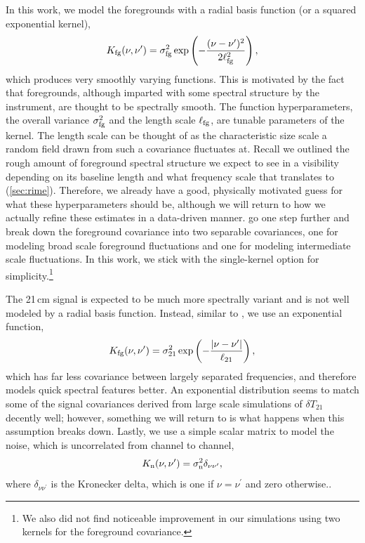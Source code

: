 \documentclass[a4paper,fleqn,usenatbib]{mnras}
\def\Kfg{K_{\rm fg}}
\def\Kn{K_{\rm n}}
\def\sigmafg{\sigma_{\rm fg}}
\def\ellfg{\ell_{\rm fg}}
\def\sigman{\sigma_{\rm n}}
\def\sigmato{\sigma_{\rm 21}}
\def\ellto{\ell_{\rm 21}}
\begin{document}
In this work, we model the foregrounds with a radial basis function (or a squared exponential kernel),
\begin{align}
\label{label:fg_kernel}
\Kfg(\nu, \nu^\prime) = \sigmafg^2\exp\left(-\frac{(\nu-\nu^\prime)^2}{2\ellfg^2}\right),
\end{align}
which produces very smoothly varying functions.
This is motivated by the fact that foregrounds, although imparted with some spectral structure by the instrument, are thought to be spectrally smooth.
The function hyperparameters, the overall variance $\sigmafg^2$ and the length scale $\ellfg$, are tunable parameters of the kernel.
The length scale can be thought of as the characteristic size scale a random field drawn from such a covariance fluctuates at.
Recall we outlined the rough amount of foreground spectral structure we expect to see in a visibility depending on its baseline length and what frequency scale that translates to (\autoref{sec:rime}).
Therefore, we already have a good, physically motivated guess for what these hyperparameters should be, although we will return to how we actually refine these estimates in a data-driven manner.
 go one step further and break down the foreground covariance into two separable covariances, one for modeling broad scale foreground fluctuations and one for modeling intermediate scale fluctuations.
In this work, we stick with the single-kernel option for simplicity.\footnote{We also did not find noticeable improvement in our simulations using two kernels for the foreground covariance.}

The 21\,cm signal is expected to be much more spectrally variant and is not well modeled by a radial basis function.
Instead, similar to , we use an exponential function,
\begin{align}
\label{label:eor_kernel}
\Kfg(\nu, \nu^\prime) = \sigmato^2\exp\left(-\frac{|\nu-\nu^\prime|}{\ellto}\right),
\end{align}
which has far less covariance between largely separated frequencies, and therefore models quick spectral features better.
An exponential distribution seems to match some of the signal covariances derived from large scale simulations of $\delta T_{21}$ decently well;
however, something we will return to is what happens when this assumption breaks down.
Lastly, we use a simple scalar matrix to model the noise, which is uncorrelated from channel to channel,
\begin{align}
\Kn(\nu, \nu^\prime) = \sigman^2\delta_{\nu\nu^\prime},
\end{align}
where $\delta_{\nu\nu^\prime}$ is the Kronecker delta, which is one if $\nu=\nu^\prime$ and zero otherwise..
\end{document}

